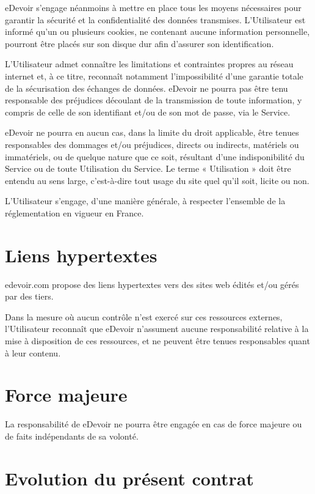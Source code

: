 eDevoir s'engage néanmoins à mettre en place tous les moyens nécessaires pour garantir la sécurité et la confidentialité des données transmises. L'Utilisateur est informé qu'un ou plusieurs cookies, ne contenant aucune information personnelle, pourront être placés sur son disque dur afin d'assurer son identification.

L'Utilisateur admet connaître les limitations et contraintes propres au réseau internet et, à ce titre, reconnaît notamment l'impossibilité d'une garantie totale de la sécurisation des échanges de données. eDevoir ne pourra pas être tenu responsable des préjudices découlant de la transmission de toute information, y compris de celle de son identifiant et/ou de son mot de passe, via le Service.

eDevoir ne pourra en aucun cas, dans la limite du droit applicable, être tenues responsables des dommages et/ou préjudices, directs ou indirects, matériels ou immatériels, ou de quelque nature que ce soit, résultant d'une indisponibilité du Service ou de toute Utilisation du Service. Le terme « Utilisation » doit être entendu au sens large, c'est-à-dire tout usage du site quel qu'il soit, licite ou non.

L'Utilisateur s'engage, d'une manière générale, à respecter l'ensemble de la réglementation en vigueur en France.


\section{Liens hypertextes}

edevoir.com propose des liens hypertextes vers des sites web édités et/ou gérés par des tiers.

Dans la mesure où aucun contrôle n'est exercé sur ces ressources externes, l'Utilisateur reconnaît que eDevoir n'assument aucune responsabilité relative à la mise à disposition de ces ressources, et ne peuvent être tenues responsables quant à leur contenu.


\section{Force majeure}

La responsabilité de eDevoir ne pourra être engagée en cas de force majeure ou de faits indépendants de sa volonté.


\section{Evolution du présent contrat}

